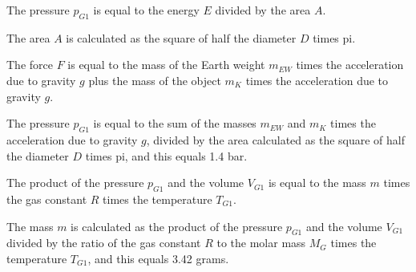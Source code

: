 The pressure \( p_{G1} \) is equal to the energy \( E \) divided by the area \( A \).

The area \( A \) is calculated as the square of half the diameter \( D \) times pi.

The force \( F \) is equal to the mass of the Earth weight \( m_{EW} \) times the acceleration due to gravity \( g \) plus the mass of the object \( m_{K} \) times the acceleration due to gravity \( g \).

The pressure \( p_{G1} \) is equal to the sum of the masses \( m_{EW} \) and \( m_{K} \) times the acceleration due to gravity \( g \), divided by the area calculated as the square of half the diameter \( D \) times pi, and this equals 1.4 bar.

The product of the pressure \( p_{G1} \) and the volume \( V_{G1} \) is equal to the mass \( m \) times the gas constant \( R \) times the temperature \( T_{G1} \).

The mass \( m \) is calculated as the product of the pressure \( p_{G1} \) and the volume \( V_{G1} \) divided by the ratio of the gas constant \( R \) to the molar mass \( M_G \) times the temperature \( T_{G1} \), and this equals 3.42 grams.
